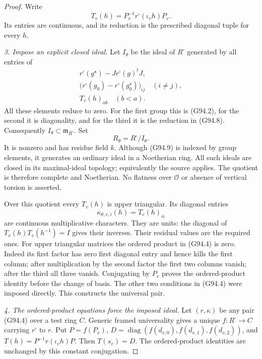 \begin{proof}
Write
\[
 T_v(h)=P_v^{-1}r^{\square}(\iota_v h)P_v.
 \tag{G94.8}
\]
Its entries are continuous, and its reduction is the
prescribed diagonal tuple for every \(h\).

\emph{3. Impose an explicit closed ideal.}
Let \(I_{\theta}\) be the ideal of \(R^{\square}\)
generated by all entries of
\[
 \begin{gathered}
 r^{\square}(g^\star)-Jr^{\square}(g)^tJ,\\
 \bigl(r^{\square}(g_0)-r^{\square}(g_0^\star)\bigr)_{ij}
       \quad(i\ne j),\\
 T_v(h)_{ab}\quad(b<a).
 \end{gathered}
 \tag{G94.9}
\]
All these elements reduce to zero.  For the first group
this is (G94.2), for the second it is diagonality, and
for the third it is the reduction in (G94.8).
Consequently \(I_{\theta}\subset\mathfrak m_{R^{\square}}\).
Set
\[
                 R_{\theta}=R^{\square}/I_{\theta}.
 \tag{G94.10}
\]
It is nonzero and has residue field \(k\).
Although (G94.9) is indexed by group elements, it generates
an ordinary ideal in a Noetherian ring.  All such ideals
are closed in its maximal-ideal topology; equivalently the
source  applies.  The quotient is therefore
complete and Noetherian.  No flatness over \(\mathcal O\)
or absence of vertical torsion is asserted.

Over this quotient every \(T_v(h)\) is upper triangular.
Its diagonal entries
\[
                  \kappa_{\theta,v,i}(h)=T_v(h)_{ii}
 \tag{G94.11}
\]
are continuous multiplicative characters.  They are units:
the diagonal of \(T_v(h)T_v(h^{-1})=I\) gives their
inverses.  Their residual values are the required ones.
For upper triangular matrices the ordered product in
(G94.4) is zero.  Indeed its first factor has zero first
diagonal entry and hence kills the first column; after
multiplication by the second factor the first two columns
vanish; after the third all three vanish.  Conjugating by
\(P_v\) proves the ordered-product identity before the
change of basis.  The other two conditions in (G94.4)
were imposed directly.  This constructs the universal pair.

\emph{4. The ordered-product equations force the imposed ideal.}
Let \((r,\kappa)\) be any pair (G94.4) over a test ring
\(C\).  Generic framed universality gives a unique
\(f:R^{\square}\to C\) carrying \(r^{\square}\) to \(r\).
Put \(P=f(P_v)\),
\(D=\operatorname{diag}(f(d_{v,0}),f(d_{v,1}),f(d_{v,2}))\),
and \(T(h)=P^{-1}r(\iota_v h)P\).
Then \(T(s_v)=D\).
The ordered-product identities are unchanged by this
constant conjugation.


\end{proof}
